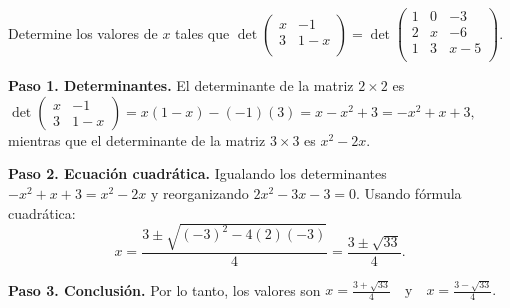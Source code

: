 \begin{prob}
Determine los valores de $x$ tales que \( \det \left( \begin{array}{cc}
x & -1 \\
3 & 1-x \\  
\end{array} \right) = \det \left( \begin{array}{ccc}
1 & 0 & -3 \\
2 & x & -6 \\
1 & 3 & x-5 \\  
\end{array} \right) \).

\begin{myproof}
\textbf{Paso 1. Determinantes.} El determinante de la matriz $2 \times 2$ es $
\det \left( \begin{array}{cc} x & -1 \\ 3 & 1-x \end{array} \right) = x(1-x) - (-1)(3) = x - x^2 + 3 = -x^2 + x + 3,$ mientras que el determinante de la matriz $3 \times 3$ es $ x^2 - 2x. $

\textbf{Paso 2. Ecuación cuadrática.} Igualando los determinantes $-x^2 + x + 3 = x^2 - 2x$ y reorganizando $2x^2 - 3x - 3 = 0.$ Usando fórmula cuadrática: \[
x = \frac{3 \pm \sqrt{(-3)^2 - 4(2)(-3)}}{4} = \frac{3 \pm \sqrt{33}}{4}.
\]

\textbf{Paso 3. Conclusión.} Por lo tanto, los valores son $
\boxed{x = \frac{3 + \sqrt{33}}{4} \quad \text{y} \quad x = \frac{3 - \sqrt{33}}{4}}.$
\end{myproof}
\end{prob}

